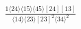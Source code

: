 \documentclass[varwidth, border=5pt]{standalone}
\begin{document}
\begin{my}
$\begin{gathered}
\scriptscriptstyle\frac{1⟨24⟩⟨15⟩⟨45⟩[24][13]}{⟨14⟩⟨23⟩[23]^2⟨34⟩^2}
\end{gathered}$
\end{my}
\end{document}
